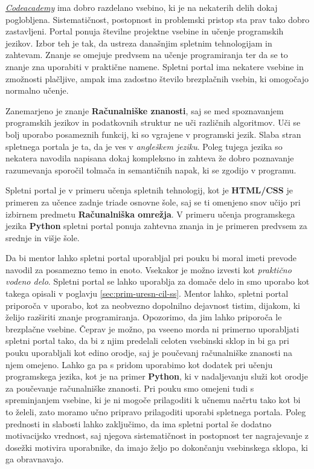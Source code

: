 \emph{\href{https://www.codecademy.com/}{Codeacademy}}
\cite{web:codeacademy} ima dobro razdelano vsebino, ki je na nekaterih
delih dokaj poglobljena. Sistematičnost, postopnost in problemski
pristop sta prav tako dobro zastavljeni. Portal ponuja številne
projektne vsebine in učenje programskih jezikov. Izbor teh je tak, da
ustreza današnjim spletnim tehnologijam in zahtevam. Znanje se omejuje
predvsem na učenje programiranja ter da se to znanje zna uporabiti v
praktične namene. Spletni portal ima nekatere vsebine in zmožnosti
plačljive, ampak ima zadostno število brezplačnih vsebin, ki omogočajo
normalno učenje. 

Zanemarjeno je znanje \textbf{Računalniške znanosti}, saj se med
spoznavanjem programskih jezikov in podatkovnih struktur ne uči
različnih algoritmov. Uči se bolj uporabo posameznih funkcij, ki so
vgrajene v programski jezik. Slaba stran spletnega portala je ta, da
je ves v \emph{angleškem jeziku}. Poleg tujega jezika so nekatera
navodila napisana dokaj kompleksno in zahteva že dobro poznavanje
razumevanja sporočil tolmača in semantičnih napak, ki se zgodijo v
programu.

Spletni portal je v primeru učenja spletnih tehnologij, kot je
\textbf{HTML/CSS} je primeren za učence zadnje triade osnovne šole,
saj se ti omenjeno snov učijo pri izbirnem predmetu
\textbf{Računalniška omrežja}. V primeru učenja programskega jezika
\textbf{Python} spletni portal ponuja zahtevna znanja in je primeren
predvsem za srednje in višje šole.

Da bi mentor lahko spletni portal uporabljal pri pouku bi moral imeti
prevode navodil za posamezno temo in enoto. Vsekakor je možno izvesti
kot \emph{praktično vodeno delo}. Spletni portal se lahko uporablja za
domače delo in smo uporabo kot takega opisali v poglavju
\ref{sec:prim-uresn-cil-ss}. Mentor lahko, spletni portal priporoča v
uporabo, kot za neobvezno dopolnilno dejavnost tistim, dijakom, ki
želijo razširiti znanje programiranja. Opozorimo, da jim lahko
priporoča le brezplačne vsebine. Čeprav je možno, pa vseeno morda ni
primerno uporabljati spletni portal tako, da bi z njim predelali
celoten vsebinski sklop in bi ga pri pouku uporabljali kot edino
orodje, saj je poučevanj računalniške znanosti na njem omejeno. Lahko
ga pa s pridom uporabimo kot dodatek pri učenju programskega jezika,
kot je na primer \textbf{Python}, ki v nadaljevanju služi kot orodje
za poučevanje računalniške znanosti.  Pri pouku smo omejeni tudi s
spreminjanjem vsebine, ki je ni mogoče prilagoditi k učnemu načrtu
tako kot bi to želeli, zato moramo učno pripravo prilagoditi uporabi
spletnega portala. Poleg prednosti in slabosti lahko zaključimo, da
ima spletni portal še dodatno motivacijsko vrednost, saj njegova
sistematičnost in postopnost ter nagrajevanje z dosežki motivira
uporabnike, da imajo željo po dokončanju vsebinskega sklopa, ki ga
obravnavajo. 

